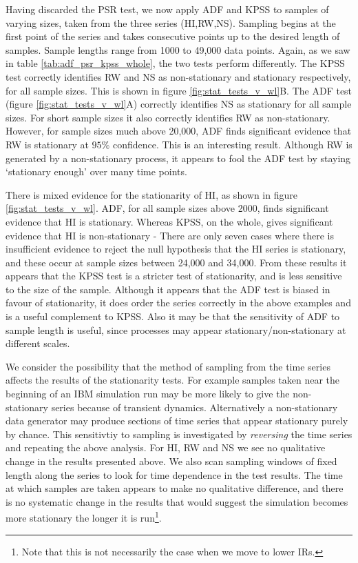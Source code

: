 Having discarded the PSR test, we now apply ADF and KPSS to samples of varying sizes, taken from the three series (HI,RW,NS). Sampling begins at the first point of the series and takes consecutive points up to the desired length of samples. Sample lengths range from 1000 to 49,000 data points. Again, as we saw in table \ref{tab:adf_psr_kpss_whole}, the two tests perform differently. The KPSS test correctly identifies RW and NS as non-stationary and stationary respectively, for all sample sizes. This is shown in figure \ref{fig:stat_tests_v_wl}B. The ADF test (figure \ref{fig:stat_tests_v_wl}A) correctly identifies NS as stationary for all sample sizes.  For short sample sizes it also correctly identifies RW as non-stationary. However, for sample sizes much above 20,000, ADF finds significant evidence that RW is stationary at $95\%$ confidence. This is an interesting result. Although RW is generated by a non-stationary process, it appears to fool the ADF test by staying `stationary enough' over many time points. 
  
There is mixed evidence for the stationarity of HI, as shown in figure \ref{fig:stat_tests_v_wl}. ADF, for all sample sizes above 2000, finds significant evidence that HI is stationary. Whereas KPSS, on the whole, gives significant evidence that HI is non-stationary - There are only seven cases where there is insufficient evidence to reject the null hypothesis that the HI series is stationary, and these occur at sample sizes between 24,000 and 34,000. From these results it appears that the KPSS test is a stricter test of stationarity, and is less sensitive to the size of the sample. Although it appears that the ADF test is biased in favour of stationarity, it does order the series correctly in the above examples and is a useful complement to KPSS. Also it may be that the sensitivity of ADF to sample length is useful, since processes may appear stationary/non-stationary at different scales. 

We consider the possibility that the method of sampling from the time series affects the results of the stationarity tests. For example samples taken near the beginning of an IBM simulation run may be more likely to give the non-stationary series because of transient dynamics. Alternatively a non-stationary data generator may produce sections of time series that appear stationary purely by chance. This sensitivtiy to sampling is investigated by \emph{reversing} the time series and repeating the above analysis. For HI, RW and NS we see no qualitative change in the results presented above. We also scan sampling windows of fixed length along the series to look for time dependence in the test results. The time at which samples are taken appears to make no qualitative difference, and there is no systematic change in the results that would suggest the simulation becomes more stationary the longer it is run\footnote{Note that this is not necessarily the case when we move to lower IRs.}. 


